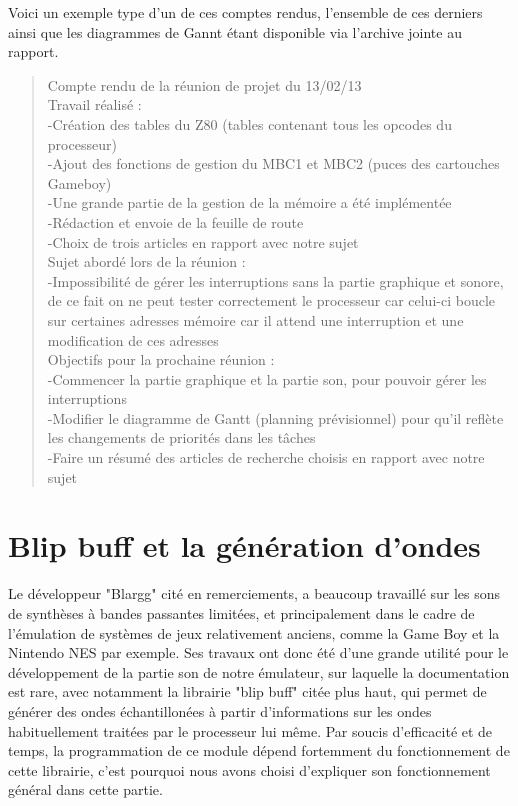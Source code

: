 \documentclass[french]{report}
\begin{document}
Voici un exemple type d'un de ces comptes rendus, l'ensemble de ces derniers ainsi que les diagrammes de Gannt étant disponible via l'archive jointe au rapport.
\begin{quotation}
Compte rendu de la réunion de projet du 13/02/13\\
Travail réalisé :\\
	-Création des tables du Z80 (tables contenant tous les opcodes du processeur)\\
	-Ajout des fonctions de gestion du MBC1 et MBC2 (puces des cartouches Gameboy)\\
	-Une grande partie de la gestion de la mémoire a été implémentée\\
	-Rédaction et envoie de la feuille de route\\
	-Choix de trois articles en rapport avec notre sujet\\
Sujet abordé lors de la réunion :\\
	-Impossibilité de gérer les interruptions sans la partie graphique et sonore, de ce fait on ne peut tester correctement le processeur car celui-ci boucle sur certaines adresses mémoire car il attend une interruption et une modification de ces adresses\\
Objectifs pour la prochaine réunion :\\
	-Commencer la partie graphique et la partie son, pour pouvoir gérer les interruptions\\
	-Modifier le diagramme de Gantt (planning prévisionnel) pour qu’il reflète les changements de priorités dans les tâches\\
	-Faire un résumé des articles de recherche choisis en rapport avec notre sujet\\

\end{quotation}

\chapter{Blip buff et la génération d'ondes}
Le développeur "Blargg" cité en remerciements, a beaucoup travaillé sur les sons de synthèses à bandes passantes limitées, et principalement dans le cadre de l'émulation de systèmes de jeux relativement anciens, comme la Game Boy et la Nintendo NES par exemple. Ses travaux ont donc été d'une grande utilité pour le développement de la partie son de notre émulateur, sur laquelle la documentation est rare, avec notamment la librairie "blip buff" citée plus haut, qui permet de générer des ondes échantillonées à partir d'informations sur les ondes habituellement traitées par le processeur lui même. Par soucis d'efficacité et de temps, la programmation de ce module dépend fortemment du fonctionnement de cette librairie, c'est pourquoi nous avons choisi d'expliquer son fonctionnement général dans cette partie.\\
\end{document}

